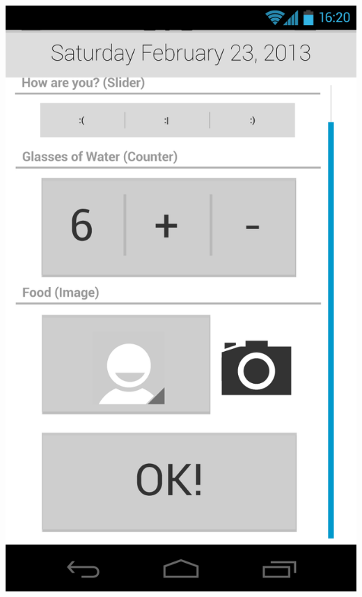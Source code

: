 \documentclass[pdftex,12pt,a4paper]{report}
\begin{document}
\includegraphics[scale=0.18]{Screens/03-Add--Scrolled.png}
\end{document}
